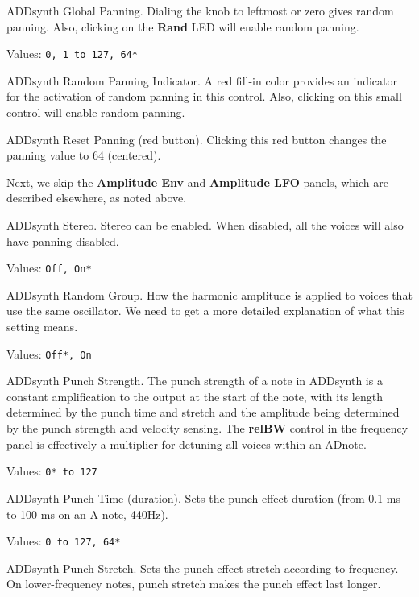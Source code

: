    ADDsynth Global Panning.
   Dialing the knob to leftmost or zero gives random panning.
   Also, clicking on the \textbf{Rand} LED will enable random panning.

   Values: \texttt{0, 1 to 127, 64*}

   ADDsynth Random Panning Indicator.
   A red fill-in color provides an indicator for the activation of random
   panning in this control.
   Also, clicking on this small control will enable random panning.

   ADDsynth Reset Panning (red button).
   Clicking this red button changes the panning value to 64 (centered).

   Next, we skip the \textbf{Amplitude Env} and \textbf{Amplitude LFO}
   panels, which are described elsewhere, as noted above.

   ADDsynth Stereo.
   Stereo can be enabled.
   When disabled, all the voices will also have panning disabled.

   Values: \texttt{Off, On*}

   ADDsynth Random Group.
   How the harmonic amplitude is applied to voices that use the same
   oscillator.
   We need to get a more detailed explanation of what this setting means.

   Values: \texttt{Off*, On}

   ADDsynth Punch Strength.
   The punch strength of a note in ADDsynth is a constant amplification to
   the output at the start of the note, with its length determined by the
   punch time and stretch and the amplitude being determined by the punch
   strength and velocity sensing. The \textbf{relBW}
   control in the frequency panel is
   effectively a multiplier for detuning all voices within an ADnote.

   Values: \texttt{0* to 127}

   ADDsynth Punch Time (duration).
   Sets the punch effect duration (from 0.1 ms to 100 ms on an A note, 440Hz).

   Values: \texttt{0 to 127, 64*}

   ADDsynth Punch Stretch.
   Sets the punch effect stretch according to frequency. On lower-frequency
   notes, punch stretch makes the punch effect last longer. 

